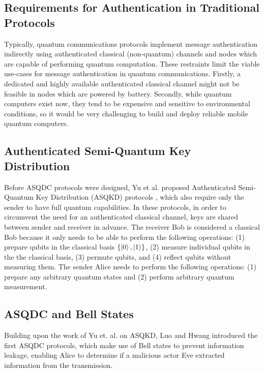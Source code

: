 \documentclass[conference]{IEEEtran}
\begin{document}
\subsection{Requirements for Authentication in Traditional Protocols}

Typically, quantum communications protocols implement message
authentication indirectly using authenticated classical (non-quantum)
channels and nodes which are capable of performing quantum computation.
These restraints limit the viable use-cases for message authentication
in quantum communications. Firstly, a dedicated and highly available
authenticated classical channel might not be feasible in nodes which are
powered by battery. Secondly, while quantum computers exist now, they tend
to be expensive and sensitive to environmental conditions, so it would be very
challenging to build and deploy reliable mobile quantum computers.

\subsection{Authenticated Semi-Quantum Key Distribution}

Before ASQDC protocols were designed, Yu et al. proposed Authenticated
Semi-Quantum Key Distribution (ASQKD) protocols \cite{YuEtAl}, which also
require only the sender to have full quantum capabilities. In these protocols,
in order to circumvent the need for an authenticated classical channel,
keys are shared between sender and receiver in advance. The receiver Bob is
considered a classical Bob because it only needs
to be able to perform the following operations: (1) prepare qubits
in the classical basis $\left\{ \ket{0} ,\ket{1} \right\} $,
(2) measure individual qubits in the the classical basis, (3) permute
qubits, and (4) reflect qubits without measuring them. The sender Alice needs
to perform the following operations: (1) prepare any arbitrary quantum states and
(2) perform arbitrary quantum measurement.

\subsection{ASQDC and Bell States}

Building upon the work of Yu et. al. on ASQKD, Luo and Hwang introduced the first
ASQDC protocols, which make use of Bell states to prevent information leakage,
enabling Alice to determine if a malicious actor Eve extracted
information from the transmission.
\end{document}
